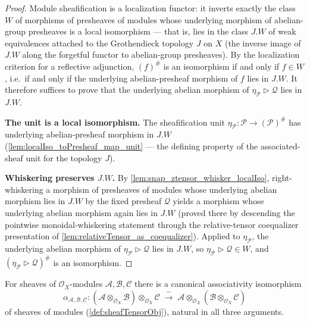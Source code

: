 \begin{proof}
    \leanok
  Module sheafification is a localization functor: it inverts exactly the class
  \(W\) of morphisms of presheaves of modules whose underlying morphism of
  abelian-group presheaves is a local isomorphism --- that is, lies in the class
  \(J.W\) of weak equivalences attached to the Grothendieck topology \(J\) on
  \(X\) (the inverse image of \(J.W\) along the forgetful functor to
  abelian-group presheaves). By the localization criterion for a reflective
  adjunction, \((f)^{\#}\) is an isomorphism if and only if \(f \in W\), i.e.\
  if and only if the underlying abelian-presheaf morphism of \(f\) lies in
  \(J.W\). It therefore suffices to prove that the underlying abelian morphism
  of \(\eta_{\mathcal{P}} \rhd \mathcal{Q}\) lies in \(J.W\).

  \textbf{The unit is a local isomorphism.} The sheafification unit
  \(\eta_{\mathcal{P}} : \mathcal{P} \to (\mathcal{P})^{\#}\) has underlying
  abelian-presheaf morphism in \(J.W\)
  (\cref{lem:localIso_toPresheaf_map_unit} — the defining property of the
  associated-sheaf unit for the topology \(J\)).

  \textbf{Whiskering preserves \(J.W\).} By
  \cref{lem:snap_ztensor_whisker_localIso}, right-whiskering a morphism of
  presheaves of modules whose underlying abelian morphism lies in \(J.W\) by
  the fixed presheaf \(\mathcal{Q}\) yields a morphism whose underlying
  abelian morphism again lies in \(J.W\) (proved there by descending the
  pointwise monoidal-whiskering statement through the relative-tensor
  coequalizer presentation of
  \cref{lem:relativeTensor_as_coequalizer}). Applied to
  \(\eta_{\mathcal{P}}\), the underlying abelian morphism of
  \(\eta_{\mathcal{P}} \rhd \mathcal{Q}\) lies in \(J.W\), so
  \(\eta_{\mathcal{P}} \rhd \mathcal{Q} \in W\), and
  \((\eta_{\mathcal{P}} \rhd \mathcal{Q})^{\#}\) is an isomorphism.
\end{proof}

\begin{corollary}
  \label{cor:sheafTensorObjAssoc}
  For sheaves of \(\mathcal{O}_X\)-modules \(\mathcal{A}, \mathcal{B},
  \mathcal{C}\) there is a canonical associativity isomorphism
  \[
    \alpha_{\mathcal{A},\mathcal{B},\mathcal{C}} :
    (\mathcal{A} \otimes_{\mathcal{O}_X} \mathcal{B})
      \otimes_{\mathcal{O}_X} \mathcal{C}
    \;\xrightarrow{\ \sim\ }\;
    \mathcal{A} \otimes_{\mathcal{O}_X}
      (\mathcal{B} \otimes_{\mathcal{O}_X} \mathcal{C})
  \]
  of sheaves of modules (\cref{def:sheafTensorObj}), natural in all three
  arguments.
\end{corollary}


